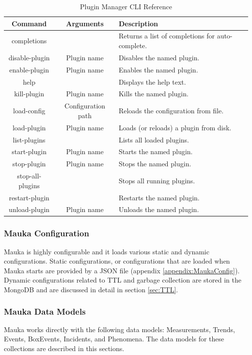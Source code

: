 \begin{table}[H]
	\centering
	\caption{Plugin Manager CLI Reference}
	\begin{tabular}{|c|c|p{8cm}|}
		\hline 
		Command & Arguments & Description \\ 
		\hline
		completions & & Returns a list of completions for auto-complete. \\
		\hline
		disable-plugin & Plugin name & Disables the named plugin. \\
		\hline
		enable-plugin & Plugin name & Enables the named plugin. \\
		\hline
		help & & Displays the help text. \\
		\hline
		kill-plugin & Plugin name & Kills the named plugin. \\
		\hline
		load-config & Configuration path & Reloads the configuration from file. \\
		\hline 
		load-plugin & Plugin name & Loads (or reloads) a plugin from disk. \\
		\hline 
		list-plugins & & Lists all loaded plugins. \\
		\hline
		start-plugin & Plugin name & Starts the named plugin. \\
		\hline 
		stop-plugin & Plugin name & Stops the named plugin. \\
		\hline
		stop-all-plugins & & Stops all running plugins. \\
		\hline
		restart-plugin & & Restarts the named plugin. \\
		\hline
		unload-plugin & Plugin name & Unloads the named plugin. \\
		\hline
	\end{tabular} 
	\label{table:PluginManager}
\end{table}

\subsubsection{Mauka Configuration}
Mauka is highly configurable and it loads various static and dynamic configurations. Static configurations, or configurations that are loaded when Mauka starts are provided by a JSON file (appendix \ref{appendix:MaukaConfig}). Dynamic configurations related to TTL and garbage collection are stored in the MongoDB and are discussed in detail in section \ref{sec:TTL}.

\subsubsection{Mauka Data Models}
Mauka works directly with the following data models: Measurements, Trends, Events, BoxEvents, Incidents, and Phenomena. The data models for these collections are described in this sections. 

